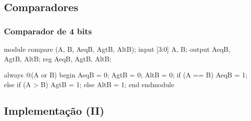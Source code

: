 \subsection{Comparadores}


\begin{frame}[fragile]
	\frametitle{Comparador de 4 bits}
	\begin{verilogcode}
module compare (A, B, AeqB, AgtB, AltB); 
  input [3:0] A, B;
  output AeqB, AgtB, AltB;
  reg AeqB, AgtB, AltB;

  always @(A or B) 
  begin
    AeqB = 0; 
    AgtB = 0; 
    AltB = 0; 
    if (A == B)
      AeqB = 1; 
    else if (A > B)
      AgtB = 1;
    else
      AltB = 1;
  end 
  endmodule
    \end{verilogcode} 
\end{frame}

\subsection{Implementação (II)}

